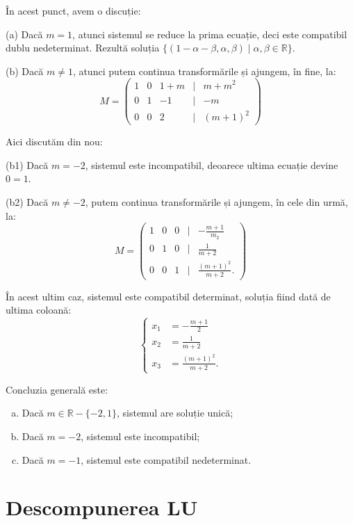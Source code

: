 \documentclass[11pt,a4paper]{article}
\newcommand\RR{\mathbb{R}}
\theoremstyle{dotless}
\theoremstyle{dotlessdr}
\begin{document}
În acest punct, avem o discuție:

(a) Dacă $m = 1$, atunci sistemul se reduce la prima ecuație, deci este compatibil
dublu nedeterminat. Rezultă soluția $\{ (1 - \alpha - \beta, \alpha, \beta) \mid \alpha, \beta \in \RR \}$.

(b) Dacă $m \neq 1$, atunci putem continua transformările și ajungem, în fine, la:
\[
  M = \begin{pmatrix}
    1 & 0 & 1 + m & \mid & m + m^2 \\
    0 & 1 & -1 & \mid & -m \\
    0 & 0 & 2 & \mid & (m + 1)^2
  \end{pmatrix}
\]

Aici discutăm din nou:

(b1) Dacă $m = -2$, sistemul este incompatibil, deoarece ultima ecuație devine $0 = 1$.

(b2) Dacă $m \neq -2$, putem continua transformările și ajungem, în cele din urmă, la:
\[
  M = \begin{pmatrix}
    1 & 0 & 0 & \mid & - \frac{m+1}{m_2}  \\
    0 & 1 & 0 & \mid & \frac{1}{m+2} \\
    0 & 0 & 1 & \mid & \frac{(m + 1)^2}{m + 2}.
  \end{pmatrix}
\]

În acest ultim caz, sistemul este compatibil determinat, soluția fiind dată de ultima coloană:
\[
  \begin{cases}
    x_1  &= -\frac{m + 1}{2} \\
    x_2  &= \frac{1}{m + 2} \\
    x_3  &= \frac{(m + 1)^2}{m + 2}.
  \end{cases}
\]

Concluzia generală este:
\begin{enumerate}[(a)]
  \item Dacă $m \in \RR - \{-2, 1\}$, sistemul are soluție unică;
  \item Dacă $m = -2$, sistemul este incompatibil;
  \item Dacă $m = -1$, sistemul este compatibil nedeterminat.
\end{enumerate}


\section{Descompunerea LU}
\end{document}
